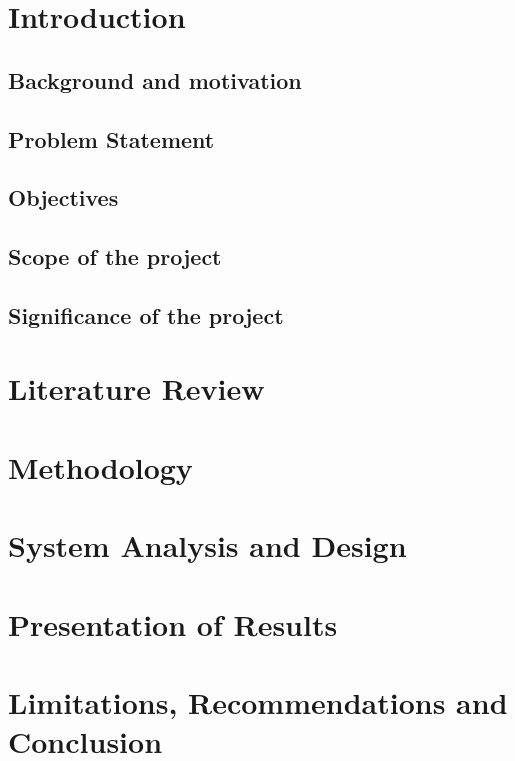 \documentclass[14pt]{report}
\begin{document}
    \tableofcontents
    \listoffigures


    \chapter{Introduction}\label{ch:introduction}


    \section{Background and motivation}\label{sec:background-and-motivation}
    


    \section{Problem Statement}\label{sec:problem-statement}
    


    \section{Objectives}\label{sec:objectives}
    


    \section{Scope of the project}\label{sec:scope-of-the-project}
    


    \section{Significance of the project}\label{sec:significance-of-the-project}
    


    \chapter{Literature Review}\label{ch:literature-review}
    


    \chapter{Methodology}\label{ch:methodology}
    


    \chapter{System Analysis and Design}\label{ch:system-analysis-and-design}
    


    \chapter{Presentation of Results}\label{ch:results-presentation}
    


    \chapter{Limitations, Recommendations and Conclusion}\label{ch:outcomes}
    
\end{document}
